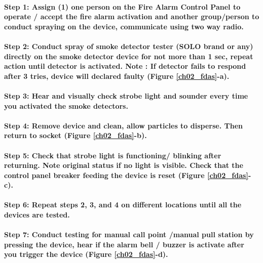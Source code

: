 \paragraph{Step 1: Assign (1) one person on the Fire Alarm Control Panel  to operate / accept  the fire alarm activation and another group/person to conduct spraying on the device, communicate using two way radio.}

\paragraph{Step 2: Conduct spray of smoke detector tester (SOLO brand or any) directly on the smoke detector device for not more than 1 sec, repeat action until detector is activated. Note : If detector fails to respond after 3 tries,  device will declared faulty (Figure \ref{ch02_fdas}-a).}

\paragraph{Step 3: Hear and visually check strobe light and sounder every time you activated the smoke detectors.}

\paragraph{Step 4: Remove device and clean, allow particles to disperse. Then return to socket (Figure \ref{ch02_fdas}-b).}

\paragraph{Step 5: Check that strobe light is functioning/ blinking after returning. Note original status if no light is visible. Check that the control panel breaker feeding the device is reset (Figure \ref{ch02_fdas}-c).}

\paragraph{Step 6: Repeat steps 2, 3, and 4 on different locations until all the devices are tested.}

\paragraph{Step 7: Conduct testing for manual call point /manual pull station by pressing the device, hear if the alarm bell / buzzer is activate after you trigger the device (Figure \ref{ch02_fdas}-d).}

